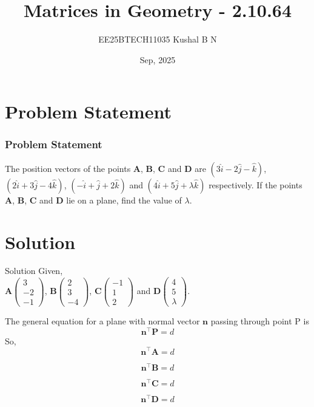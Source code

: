 \documentclass{beamer}
\title{Matrices in Geometry - 2.10.64}
\author{EE25BTECH11035  Kushal B N}
\date{Sep, 2025}
\let\vec\mathbf
\providecommand{\brak}[1]{\ensuremath{\left(#1\right)}}
\theoremstyle{remark}
\newcommand{\myvec}[1]{\ensuremath{\begin{pmatrix}#1\end{pmatrix}}}
\begin{document}
\maketitle

\section{Problem Statement}
\begin{frame}
\frametitle{Problem Statement}
The position vectors of the points $\vec{A}$, $\vec{B}$, $\vec{C}$ and $\vec{D}$ are $\brak{3\hat{i}-2\hat{j}-\hat{k}}$, $\brak{2\hat{i}+3\hat{j}-4\hat{k}}$, $\brak{-\hat{i}+\hat{j}+2\hat{k}}$ and $\brak{4\hat{i}+5\hat{j}+\lambda\hat{k}}$ respectively. If the points $\vec{A}$, $\vec{B}$, $\vec{C}$ and $\vec{D}$ lie on a plane, find the value of $\lambda$.

\end{frame}

\section{Solution}
\begin{frame}{Solution}
Given,\\
$\vec{A}\myvec{3\\-2\\-1}$, $\vec{B}\myvec{2\\3\\-4}$, $\vec{C}\myvec{-1\\1\\2}$ and $\vec{D}\myvec{4\\5\\\lambda}$.

The general equation for a plane with normal vector $\vec{n}$ passing through point P is \\
\begin{equation}
    \vec{n}^{\top}\vec{P} = d
\end{equation}
So,
\begin{equation}
    \vec{n}^{\top}\vec{A} = d
\end{equation}

\begin{equation}
    \vec{n}^{\top}\vec{B} = d
\end{equation}

\begin{equation}
    \vec{n}^{\top}\vec{C} = d
\end{equation}

\begin{equation}
    \vec{n}^{\top}\vec{D} = d
\end{equation}

\end{frame}
\end{document}

